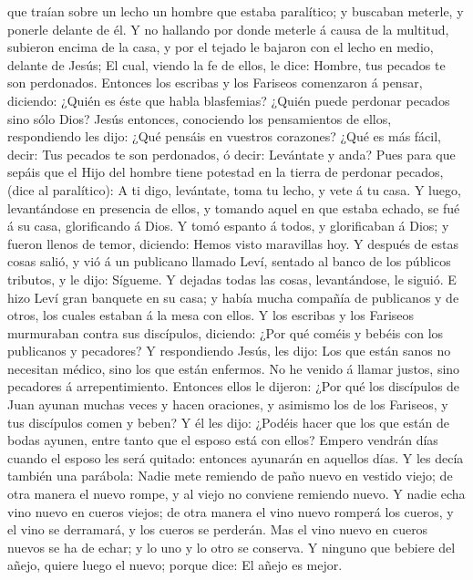 que traían sobre un lecho un hombre que estaba paralítico; y buscaban
meterle, y ponerle delante de él.  Y no hallando por donde
meterle á causa de la multitud, subieron encima de la casa, y por el
tejado le bajaron con el lecho en medio, delante de Jesús; 
El cual, viendo la fe de ellos, le dice: Hombre, tus pecados te son
perdonados.  Entonces los escribas y los Fariseos
comenzaron á pensar, diciendo: ¿Quién es éste que habla blasfemias?
¿Quién puede perdonar pecados sino sólo Dios?  Jesús
entonces, conociendo los pensamientos de ellos, respondiendo les dijo:
¿Qué pensáis en vuestros corazones?  ¿Qué es más fácil,
decir: Tus pecados te son perdonados, ó decir: Levántate y anda?
 Pues para que sepáis que el Hijo del hombre tiene potestad
en la tierra de perdonar pecados, (dice al paralítico): A ti digo,
levántate, toma tu lecho, y vete á tu casa.  Y luego,
levantándose en presencia de ellos, y tomando aquel en que estaba
echado, se fué á su casa, glorificando á Dios.  Y tomó
espanto á todos, y glorificaban á Dios; y fueron llenos de temor,
diciendo: Hemos visto maravillas hoy.  Y después de estas
cosas salió, y vió á un publicano llamado Leví, sentado al banco de los
públicos tributos, y le dijo: Sígueme.  Y dejadas todas las
cosas, levantándose, le siguió.  E hizo Leví gran banquete
en su casa; y había mucha compañía de publicanos y de otros, los cuales
estaban á la mesa con ellos.  Y los escribas y los Fariseos
murmuraban contra sus discípulos, diciendo: ¿Por qué coméis y bebéis con
los publicanos y pecadores?  Y respondiendo Jesús, les
dijo: Los que están sanos no necesitan médico, sino los que están
enfermos.  No he venido á llamar justos, sino pecadores á
arrepentimiento.  Entonces ellos le dijeron: ¿Por qué los
discípulos de Juan ayunan muchas veces y hacen oraciones, y asimismo los
de los Fariseos, y tus discípulos comen y beben?  Y él les
dijo: ¿Podéis hacer que los que están de bodas ayunen, entre tanto que
el esposo está con ellos?  Empero vendrán días cuando el
esposo les será quitado: entonces ayunarán en aquellos días.
 Y les decía también una parábola: Nadie mete remiendo de
paño nuevo en vestido viejo; de otra manera el nuevo rompe, y al viejo
no conviene remiendo nuevo.  Y nadie echa vino nuevo en
cueros viejos; de otra manera el vino nuevo romperá los cueros, y el
vino se derramará, y los cueros se perderán.  Mas el vino
nuevo en cueros nuevos se ha de echar; y lo uno y lo otro se conserva.
 Y ninguno que bebiere del añejo, quiere luego el nuevo;
porque dice: El añejo es mejor.

